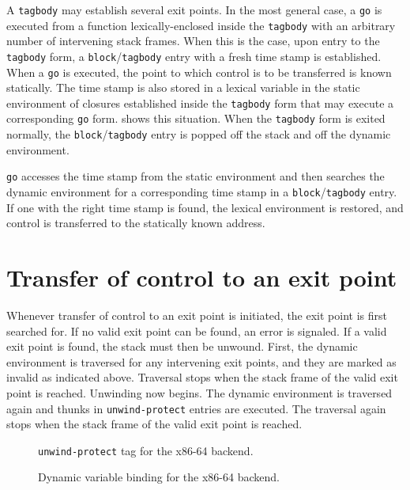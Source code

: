 A \texttt{tagbody} may establish several exit points.  In the most
general case, a \texttt{go} is executed from a function
lexically-enclosed inside the \texttt{tagbody} with an arbitrary
number of intervening stack frames.  When this is the case, upon entry
to the \texttt{tagbody} form, a \texttt{block}/\texttt{tagbody} entry
with a fresh time stamp is established.  When a \texttt{go} is
executed, the point to which control is to be transferred is known
statically.  The time stamp is also stored in a lexical variable in
the static environment of closures established inside the
\texttt{tagbody} form that may execute a corresponding \texttt{go}
form.   shows this situation.  When the
\texttt{tagbody} form is exited normally, the
\texttt{block}/\texttt{tagbody} entry is popped off the stack and off
the dynamic environment.

\texttt{go} accesses the time stamp from the static environment and
then searches the dynamic environment for a corresponding time stamp
in a \texttt{block}/\texttt{tagbody} entry.  If one with the right
time stamp is found, the lexical environment is restored, and control
is transferred to the statically known address.

\section{Transfer of control to an exit point}

Whenever transfer of control to an exit point is initiated, the exit
point is first searched for.  If no valid exit point can be found, an
error is signaled.  If a valid exit point is found, the stack must
then be unwound.  First, the dynamic environment is traversed for any
intervening exit points, and they are marked as invalid as indicated
above.  Traversal stops when the stack frame of the valid exit point
is reached.  Unwinding now begins.  The dynamic environment is
traversed again and thunks in \texttt{unwind-protect} entries are
executed.  The traversal again stops when the stack frame of the valid
exit point is reached.

\begin{figure}
\begin{center}
\end{center}
\caption{\label{fig-x86-64-unwind-protect}
\texttt{unwind-protect} tag for the x86-64 backend.}
\end{figure}

\begin{figure}
\begin{center}
\end{center}
\caption{\label{fig-x86-64-dynamic-binding}
Dynamic variable binding for the x86-64 backend.}
\end{figure}

